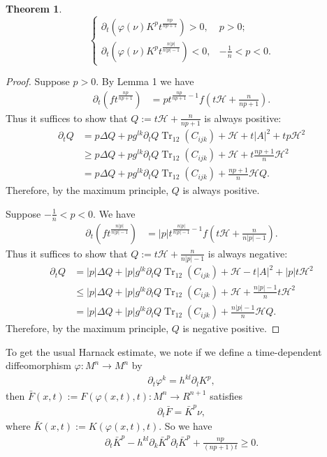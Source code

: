 \documentclass{amsart}
\newtheorem{theorem}{Theorem}
\theoremstyle{definition}
\theoremstyle{remark}
\DeclareMathOperator{\Tr}{Tr}
\numberwithin{equation}{section}
\begin{document}
\begin{theorem}
\[\left\{
  \begin{array}{ll}
    \partial_t \left(\varphi(\nu)K^pt^{\frac{n p }{n p +1}}\right)> 0, & p>0; \\
    \partial_t \left(\varphi(\nu)K^pt^{\frac{n |p| }{n |p| -1}}\right)<0, & -\frac{1}{n}<p<0.
  \end{array}
\right.
\]
\end{theorem}
\begin{proof}
Suppose $p>0.$
By Lemma 1 we have
\begin{align*}
\partial_t \left(ft^{\frac{n p }{n p +1}}\right)&= p  t^{\frac{n p }{n p +1}-1}f\left(t\mathcal{H}+\frac{n}{n p +1}\right).
\end{align*}
Thus it suffices to show that $Q:=t\mathcal{H}+\frac{n}{n p +1}$ is always positive:
\begin{align*}
\partial_t Q&= p\Delta Q+ p  g^{lk}\partial_lQ \Tr_{12}( C _{ijk})+\mathcal{H}+t| A |^2+  tp \mathcal{H}^2\\
&\geq  p \Delta Q+ p  g^{lk}\partial_lQ \Tr_{12}( C _{ijk})+\mathcal{H}+t\frac{n p +1}{n} \mathcal{H}^2\\
&= p \Delta Q+ p  g^{lk}\partial_lQ \Tr_{12}( C _{ijk})+\frac{n p +1}{n}\mathcal{H}Q.
\end{align*}
Therefore, by the maximum principle, $Q$ is always positive.


Suppose $-\frac{1}{n}<p<0.$ We have
\begin{align*}
\partial_t \left(ft^{\frac{n |p| }{n |p| -1}}\right)&= |p|  t^{\frac{n |p| }{n |p| -1}-1}f\left(t\mathcal{H}+\frac{n}{n |p| -1}\right).
\end{align*}
Thus it suffices to show that $Q:=t\mathcal{H}+\frac{n}{n |p| -1}$ is always negative:
\begin{align*}
\partial_t Q&= |p| \Delta Q+ |p|  g^{lk}\partial_lQ \Tr_{12}( C _{ijk})+\mathcal{H}-t| A |^2+ |p|  t \mathcal{H}^2\\
&\leq  |p| \Delta Q+ |p|  g^{lk}\partial_lQ \Tr_{12}( C _{ijk})+\mathcal{H}+\frac{n |p| -1}{n}t \mathcal{H}^2\\
&= |p| \Delta Q+ |p|  g^{lk}\partial_lQ \Tr_{12}( C _{ijk})+\frac{n |p| -1}{n}\mathcal{H}Q.
\end{align*}
Therefore, by the maximum principle, $Q$ is negative positive.
\end{proof}

To get the usual Harnack estimate, we note if we define a time-dependent diffeomorphism $\varphi: M^n\to M^n$ by
\begin{align}
\partial_t\varphi^k=h^{kl}\partial_l K^{ p },
\end{align}
then $\bar{F}(x,t):=F(\varphi(x,t),t):M^{n}\to R^{n+1}$ satisfies
\begin{align}
\partial_t\bar{F}=\bar{K}^{ p }\nu,
\end{align}
where $\bar{K}(x,t):=K(\varphi(x,t),t)$. So we have
\begin{align}
\partial_t\bar{K}^{ p }-h^{kl}\partial_k\bar{K}^{ p }\partial_l\bar{K}^{ p }+\frac{n p }{(n p +1)t}\geq 0.
\end{align}
\end{document}

